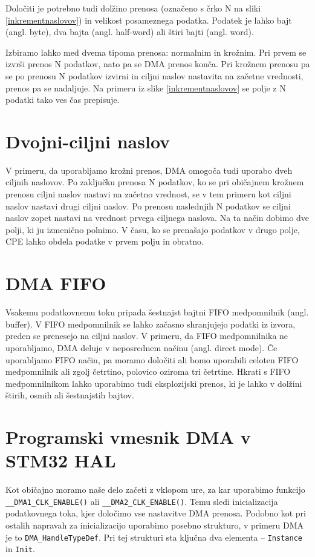 \documentclass[12pt,letterpaper]{article}
\begin{document}
Določiti je potrebno tudi dolžino prenosa (označeno s črko N na sliki \ref{inkrementnaslovov}) in velikost posameznega podatka. Podatek je lahko bajt (angl. byte), dva bajta (angl. half-word) ali štiri bajti (angl. word).

Izbiramo lahko med dvema tipoma prenosa: normalnim in krožnim. Pri prvem se izvrši prenos N podatkov, nato pa se DMA prenos konča. Pri krožnem prenosu pa se po prenosu N podatkov izvirni in ciljni naslov nastavita na začetne vrednosti, prenos pa se nadaljuje. Na primeru iz slike \ref{inkrementnaslovov} se polje z N podatki tako ves čas prepisuje.


\section*{Dvojni-ciljni naslov}

V primeru, da uporabljamo krožni prenos, DMA omogoča tudi uporabo dveh ciljnih naslovov. Po zaključku prenosa N podatkov, ko se pri običajnem krožnem prenosu ciljni naslov nastavi na začetno vrednost, se v tem primeru kot ciljni naslov nastavi drugi ciljni naslov. Po prenosu naslednjih N podatkov se ciljni naslov zopet nastavi na vrednost prvega ciljnega naslova. Na ta način dobimo dve polji, ki ju izmenično polnimo. V času, ko se prenašajo podatkov v drugo polje, CPE lahko obdela podatke v prvem polju in obratno.

\section*{DMA FIFO}

Vsakemu podatkovnemu toku pripada šestnajst bajtni FIFO medpomnilnik (angl. buffer). V FIFO medpomnilnik se lahko začasno shranjujejo podatki iz izvora, preden se prenesejo na ciljni naslov. V primeru, da FIFO medpomnilnika ne uporabljamo, DMA deluje v neposrednem načinu (angl. direct mode). Če uporabljamo FIFO način, pa moramo določiti ali bomo uporabili celoten FIFO medpomnilnik ali zgolj četrtino, polovico oziroma tri četrtine. Hkrati s FIFO medpomnilnikom lahko uporabimo tudi eksplozijski prenos, ki je lahko v dolžini štirih, osmih ali šestnajstih bajtov.


\section*{Programski vmesnik DMA v STM32 HAL}

Kot običajno moramo naše delo začeti z vklopom ure, za kar uporabimo funkcijo \texttt{\_\_DMA1\_CLK\_ENABLE()} ali \texttt{\_\_DMA2\_CLK\_ENABLE()}. Temu sledi inicializacija podatkovnega toka, kjer določimo vse nastavitve DMA prenosa. Podobno kot pri ostalih napravah za inicializacijo uporabimo posebno strukturo, v primeru DMA je to \texttt{DMA\_HandleTypeDef}. Pri tej strukturi sta ključna dva elementa -- \texttt{Instance} in \texttt{Init}.
\end{document}
